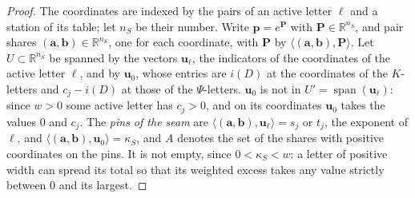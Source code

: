 \documentclass[11pt]{article}
\theoremstyle{plain}
\theoremstyle{definition}
\theoremstyle{remark}
\newcommand{\R}{\mathbb R}
\begin{document}
\begin{proof}
The coordinates are indexed by the pairs of an active letter $\ell$ and a station of its table; let $n_S$ be their number. Write $\mathbf p=e^{\mathbf P}$ with $\mathbf P\in\R^{n_S}$, and pair shares $(\mathbf a,\mathbf b)\in\R^{n_S}$, one for each coordinate, with $\mathbf P$ by $\langle(\mathbf a,\mathbf b),\mathbf P\rangle$. Let $U\subset\R^{n_S}$ be spanned by the vectors $\mathbf u_\ell$, the indicators of the coordinates of the active letter $\ell$, and by $\mathbf u_0$, whose entries are $i(D)$ at the coordinates of the $K$-letters and $c_j-i(D)$ at those of the $\Psi$-letters. $\mathbf u_0$ is not in $U'=\operatorname{span}(\mathbf u_\ell)$: since $w>0$ some active letter has $c_j>0$, and on its coordinates $\mathbf u_0$ takes the values $0$ and $c_j$. The \emph{pins of the seam} are $\langle(\mathbf a,\mathbf b),\mathbf u_\ell\rangle=s_j$ or $t_j$, the exponent of $\ell$, and $\langle(\mathbf a,\mathbf b),\mathbf u_0\rangle=\kappa_S$, and $A$ denotes the set of the shares with positive coordinates on the pins. It is not empty, since $0<\kappa_S<w$: a letter of positive width can spread its total so that its weighted excess takes any value strictly between $0$ and its largest.


\end{proof}
\end{document}
